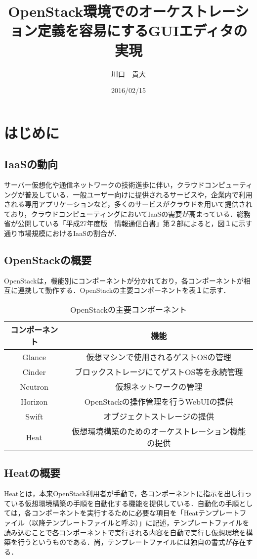 \documentclass[mingoth]{kut-paper}		%
\title{OpenStack環境でのオーケストレーション定義を容易にするGUIエディタの実現}
\author{川口　貴大}
\date{2016/02/15}
\begin{document}
\maketitle

\chapter{はじめに}
%
	\section{IaaSの動向}
	サーバー仮想化や通信ネットワークの技術進歩に伴い，クラウドコンピューティングが普及している．一般ユーザー向けに提供されるサービスや，企業内で利用される専用アプリケーションなど，多くのサービスがクラウドを用いて提供されており，クラウドコンピューティングにおいてIaaSの需要が高まっている．総務省が公開している「平成27年度版　情報通信白書」第２部によると，図１に示す通り市場規模におけるIaaSの割合が．
	\section{OpenStackの概要}
	OpenStackは，機能別にコンポーネントが分かれており，各コンポーネントが相互に連携して動作する．OpenStackの主要コンポーネントを表１に示す．
	\begin{table}[ht]
		\begin{center}
			\caption{OpenStackの主要コンポーネント}
			\begin{tabular}{|c|c|}\hline
				コンポーネント & 機能\\ \hline \hline
	     		Glance & 仮想マシンで使用されるゲストOSの管理\\ \hline
				Cinder & ブロックストレージにてゲストOS等を永続管理\\ \hline
				Neutron & 仮想ネットワークの管理\\ \hline
				Horizon & OpenStackの操作管理を行うWebUIの提供\\ \hline
				Swift & オブジェクトストレージの提供\\ \hline
				Heat & 仮想環境構築のためのオーケストレーション機能の提供\\ \hline
			\end{tabular}
		\end{center}
	\end{table}
	\section{Heatの概要}
	Heatとは，本来OpenStack利用者が手動で，各コンポーネントに指示を出し行っている仮想環境構築の手順を自動化する機能を提供している．自動化の手順としては，各コンポーネントを実行するために必要な項目を「Heatテンプレートファイル（以降テンプレートファイルと呼ぶ）」に記述，テンプレートファイルを読み込むことで各コンポーネントで実行される内容を自動で実行し仮想環境を構築を行うというものである．尚，テンプレートファイルには独自の書式が存在する．
\end{document}
